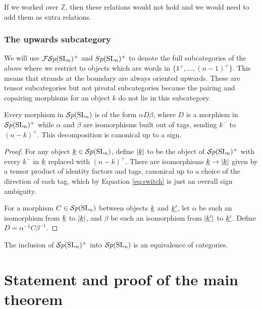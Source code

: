 \documentclass[11pt,leqno]{article}
\begin{document}
\begin{rem}
If we worked over $ \mathbb Z$, then these relations would not hold and we would need to add them as extra relations.
\end{rem}


\subsubsection{The upwards subcategory}
We will use ${\mathcal{FS}p}({\rm{SL}}_n)^+$ and $Sp({\rm{SL}}_n)^+$ to denote the full subcategories of the above where we restrict to objects which are words in $\{1^+,\ldots,(n-1)^+\}$. This means that strands at the boundary are always oriented upwards. These are tensor subcategories but not pivotal subcategories because the pairing and copairing morphisms for an object $k$ do not lie in this subcategory.

\begin{lem}
Every morphism in ${\mathcal{S}p}({\rm{SL}}_n)$ is of the form $\alpha D \beta$, where $D$ is a morphism in ${\mathcal{S}p}({\rm{SL}}_n)^+$ while $\alpha$ and $\beta$ are isomorphisms built out of tags, sending $k^-$ to $(n-k)^+$.  This decomposition is canonical up to a sign.
\end{lem}
\begin{proof}
For any object ${\underline{k}} \in {\mathcal{S}p}({\rm{SL}}_n)$, define $\left|{\underline{k}}\right|$ to be the object of ${\mathcal{S}p}({\rm{SL}}_n)^+$ with every $k^-$ in ${\underline{k}}$ replaced with $(n-k)^+$. There are isomorphisms ${\underline{k}} \to \left|{\underline{k}}\right|$ given by a tensor product of identity factors and tags, canonical up to a choice of the direction of each tag, which by Equation \eqref{eq:switch} is just an overall sign ambiguity.

For a morphism $C \in {\mathcal{S}p}({\rm{SL}}_n)$ between objects ${\underline{k}}$ and ${\underline{k'}}$, let $\alpha$ be such an isomorphism from ${\underline{k}}$ to $\left|{\underline{k}}\right|$, and $\beta$ be such an isomorphism from $\left|{\underline{k'}}\right|$ to ${\underline{k'}}$. Define $D = \alpha^{-1} C \beta^{-1}$.
\end{proof}

\begin{cor}
The inclusion of ${\mathcal{S}p}({\rm{SL}}_n)^+$ into $ {\mathcal{S}p}({\rm{SL}}_n) $ is an equivalence of categories.
\end{cor}

\section{Statement and proof of the main theorem}\label{sec:theorem}
\end{document}
